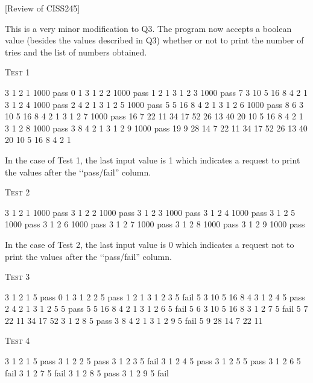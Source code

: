 [Review of CISS245]

This is a very minor modification to Q3. 
The program now accepts a boolean value (besides the values described in Q3) 
whether or not to print the number of tries and the list of numbers obtained.

\textsc{Test 1}
\begin{console}[frame=single,fontsize=\footnotesize, commandchars=\\\{\}]
3 1 2 1 1000 pass 0 1
3 1 2 2 1000 pass 1 2 1
3 1 2 3 1000 pass 7 3 10 5 16 8 4 2 1
3 1 2 4 1000 pass 2 4 2 1
3 1 2 5 1000 pass 5 5 16 8 4 2 1
3 1 2 6 1000 pass 8 6 3 10 5 16 8 4 2 1
3 1 2 7 1000 pass 16 7 22 11 34 17 52 26 13 40 20 10 5 16 8 4 2 1
3 1 2 8 1000 pass 3 8 4 2 1
3 1 2 9 1000 pass 19 9 28 14 7 22 11 34 17 52 26 13 40 20 10 5 16 8 4 2 1
\end{console}

In the case of Test 1, 
the last input value is 1 which indicates a request to print the values after 
the \lq\lq pass/fail'' column.


\textsc{Test 2}
\begin{console}[frame=single,fontsize=\footnotesize, commandchars=\\\{\}]
3 1 2 1 1000 pass
3 1 2 2 1000 pass
3 1 2 3 1000 pass
3 1 2 4 1000 pass
3 1 2 5 1000 pass
3 1 2 6 1000 pass
3 1 2 7 1000 pass
3 1 2 8 1000 pass
3 1 2 9 1000 pass
\end{console}
In the case of Test 2, 
the last input value is 0 which indicates a request not to print the 
values after the \lq\lq pass/fail'' column.

\textsc{Test 3}
\begin{console}[frame=single,fontsize=\footnotesize, commandchars=\\\{\}]
3 1 2 1 5 pass 0 1
3 1 2 2 5 pass 1 2 1
3 1 2 3 5 fail 5 3 10 5 16 8 4
3 1 2 4 5 pass 2 4 2 1
3 1 2 5 5 pass 5 5 16 8 4 2 1
3 1 2 6 5 fail 5 6 3 10 5 16 8
3 1 2 7 5 fail 5 7 22 11 34 17 52
3 1 2 8 5 pass 3 8 4 2 1
3 1 2 9 5 fail 5 9 28 14 7 22 11
\end{console}

\textsc{Test 4}
\begin{console}[frame=single,fontsize=\footnotesize,commandchars=\\\{\}]
3 1 2 1 5 pass
3 1 2 2 5 pass
3 1 2 3 5 fail
3 1 2 4 5 pass
3 1 2 5 5 pass
3 1 2 6 5 fail
3 1 2 7 5 fail
3 1 2 8 5 pass
3 1 2 9 5 fail
\end{console}
